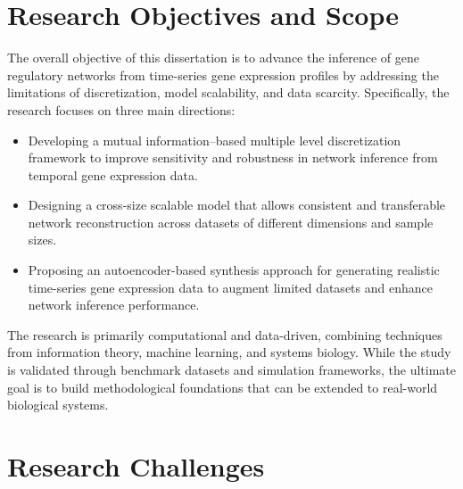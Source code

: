 \section{Research Objectives and Scope}

The overall objective of this dissertation is to advance the inference of gene regulatory networks from time-series gene expression profiles by addressing the limitations of discretization, model scalability, and data scarcity. Specifically, the research focuses on three main directions:
\begin{itemize}
\item Developing a mutual information–based multiple level discretization framework to improve sensitivity and robustness in network inference from temporal gene expression data.

\item Designing a cross-size scalable model that allows consistent and transferable network reconstruction across datasets of different dimensions and sample sizes.

\item Proposing an autoencoder-based synthesis approach for generating realistic time-series gene expression data to augment limited datasets and enhance network inference performance.
\end{itemize}
The research is primarily computational and data-driven, combining techniques from information theory, machine learning, and systems biology. While the study is validated through benchmark datasets and simulation frameworks, the ultimate goal is to build methodological foundations that can be extended to real-world biological systems.

\section{Research Challenges}

